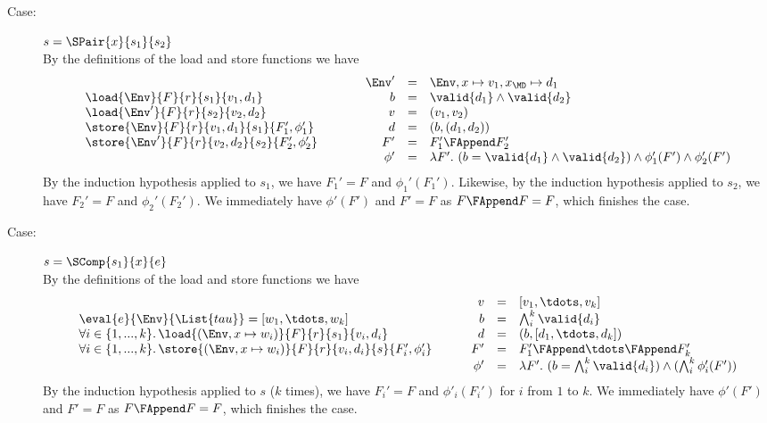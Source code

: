 {\begin{description}
\item[Case:]$s = \SPair{x}{s_1}{s_2}$\\[1ex]
%
By the definitions of the load and store functions we have 
\[ 
\begin{array}{l}
\load{\Env}{F}{r}{s_1}{v_1,d_1}\\
\load{\Env'}{F}{r}{s_2}{v_2,d_2}\\
\store{\Env}{F}{r}{v_1,d_1}{s_1}{F_1',\phi_1'}\\
\store{\Env'}{F}{r}{v_2,d_2}{s_2}{F_2',\phi_2'}\\
\end{array} \hspace*{1cm}
\begin{array}{rcl}
\Env' &=& \Env,x \mapsto v_1, x_{\MD} \mapsto d_1\\
b &= & \valid{d_1} \wedge \valid{d_2}\\
v &=& (v_1,v_2)\\
d &=& (b,(d_1,d_2))\\
F' &=& F_1' \FAppend F_2'\\
\phi' &=& \lambda F'.~(b = \valid{d_1} \wedge \valid{d_2}) \wedge \phi_1'(F') \wedge \phi_2'(F')\\
\end{array}
\]
By the induction hypothesis applied to $s_1$, we have $F_1' = F$ and
$\phi_1'(F_1')$. Likewise, by the induction hypothesis applied to
$s_2$, we have $F_2' = F$ and $\phi_2'(F_2')$. We immediately have
$\phi'(F')$ and $F' = F$ as $F \FAppend F = F$, which finishes
the case.

\item[Case:] $s = \SComp{s_1}{x}{e}$\\[1ex]
%
By the definitions of the load and store functions we have 
\[ 
\begin{array}{l}
\eval{e}{\Env}{\List{tau}} = [w_1,\tdots,w_k ]\\
\forall i \in \{1,...,k\}.\,\load{(\Env, x \mapsto w_i)}{F}{r}{s_1}{v_i,d_i}\\
\forall i \in \{1,...,k\}.\,\store{(\Env, x \mapsto w_i)}{F}{r}{v_i,d_i}{s}{F_i',\phi_i'}\\
\end{array}\hspace*{.75cm}\begin{array}{rcl}
v &=& [v_1,\tdots,v_k]\\
b &= &\bigwedge_i^k \valid{d_i}\\
d &=& (b,[d_1,\tdots,d_k])\\
F' &=& F_1' \FAppend \tdots \FAppend F_k'\\
\phi' &=& \lambda F'.~(b = \bigwedge_i^k \valid{d_i}) \wedge (\bigwedge_i^k \phi_i'(F'))\\
\end{array}
\]
By the induction hypothesis applied to $s$ ($k$ times), we have $F_i'
= F$ and $\phi'_i(F_i')$ for $i$ from $1$ to $k$. We immediately have
$\phi'(F')$ and $F' = F$ as $F \FAppend F = F$, which finishes
the case.


\end{description}}
